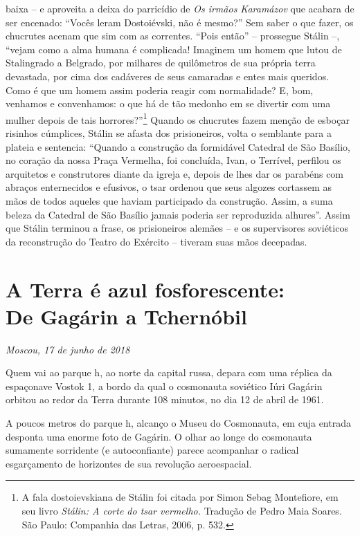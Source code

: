 baixa -- e aproveita a deixa do parricídio de \emph{Os irmãos Karamázov}
que acabara de ser encenado: ``Vocês leram Dostoiévski, não é mesmo?''
Sem saber o que fazer, os chucrutes acenam que sim com as correntes.
``Pois então'' -- prossegue Stálin --, ``vejam como a alma humana é
complicada! Imaginem um homem que lutou de Stalingrado a Belgrado, por
milhares de quilômetros de sua própria terra devastada, por cima dos
cadáveres de seus camaradas e entes mais queridos. Como é que um homem
assim poderia reagir com normalidade? E, bom, venhamos e convenhamos: o
que há de tão medonho em se divertir com uma mulher depois de tais
horrores?''\footnote{A fala dostoievskiana de Stálin foi citada por
  Simon Sebag Montefiore, em seu livro \emph{Stálin: A corte do tsar
  vermelho.} Tradução de Pedro Maia Soares. São Paulo: Companhia das
  Letras, 2006, p. 532.} Quando os chucrutes fazem menção de esboçar
risinhos cúmplices, Stálin se afasta dos prisioneiros, volta o semblante
para a plateia e sentencia: ``Quando a construção da formidável Catedral
de São Basílio, no coração da nossa Praça Vermelha, foi concluída, Ivan,
o Terrível, perfilou os arquitetos e construtores diante da igreja e,
depois de lhes dar os parabéns com abraços enternecidos e efusivos, o
tsar ordenou que seus algozes cortassem as mãos de todos aqueles que
haviam participado da construção. Assim, a suma beleza da Catedral de
São Basílio jamais poderia ser reproduzida alhures''. Assim que Stálin
terminou a frase, os prisioneiros alemães -- e os supervisores
soviéticos da reconstrução do Teatro do Exército -- tiveram suas mãos
decepadas.

\chapter*{A Terra é azul fosforescente:\\De Gagárin a Tchernóbil}

\begin{flushright}
\emph{Moscou, 17 de junho de 2018}
\end{flushright}

Quem vai ao parque h, ao norte da capital russa, depara com uma
réplica da espaçonave Vostok 1, a bordo da qual o cosmonauta soviético
Iúri Gagárin orbitou ao redor da Terra durante 108 minutos, no dia 12 de
abril de 1961.

A poucos metros do parque h, alcanço o Museu do Cosmonauta, em cuja
entrada desponta uma enorme foto de Gagárin. O olhar ao longe do
cosmonauta sumamente sorridente (e autoconfiante) parece acompanhar o
radical esgarçamento de horizontes de sua revolução aeroespacial.

